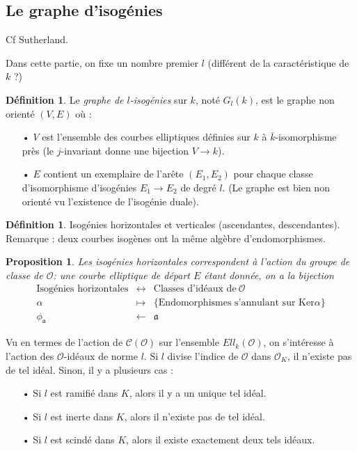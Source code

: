 \documentclass[11pt,a4paper]{article}
\renewcommand{\O}{\mathcal{O}}
\newcommand{\Cl}{\mathcal{C}}
\newcommand{\vers}{\rightarrow}
\renewcommand{\frak}{\mathfrak}
\newtheorem{prop}[thm]{Proposition}
\theoremstyle{definition}
\newtheorem{defi}[thm]{Définition}
\begin{document}
\subsection{Le graphe d'isogénies}

Cf Sutherland.

Dans cette partie, on fixe un nombre premier $l$ (différent de la caractéristique de $k$ ?)

\begin{defi}
Le \emph{graphe de $l$-isogénies} sur $k$, noté $G_l(k)$, est le graphe non orienté $(V,E)$ où :
\begin{itemize}
\item[•] $V$ est l'ensemble des courbes elliptiques définies sur $k$ à $\bar{k}$-isomorphisme près (le $j$-invariant donne une bijection $V\vers k$).
\item[•] $E$ contient un exemplaire de l'arête $(E_1,E_2)$ pour chaque classe d'isomorphisme d'isogénies $E_1\vers E_2$ de degré $l$. (Le graphe est bien non orienté vu l'existence de l'isogénie duale).
\end{itemize}

\end{defi}

\begin{defi}
Isogénies horizontales et verticales (ascendantes, descendantes). Remarque : deux courbes isogènes ont la même algèbre d'endomorphismes.
\end{defi}

\begin{prop}
Les isogénies horizontales correspondent à l'action du groupe de classe de $\O$: une courbe elliptique de départ $E$ étant donnée, on a la bijection
$$\begin{aligned}
\text{Isogénies horizontales} &\leftrightarrow &\text{Classes d'idéaux de}\ \O \\
\alpha &\mapsto &\{\text{Endomorphismes s'annulant sur Ker}\alpha \} \\
\phi_{\frak a} &\leftarrow &\frak a
\end{aligned}$$
\end{prop}

Vu en termes de l'action de $\Cl(\O)$ sur l'ensemble $Ell_k(\O)$, on s'intéresse à l'action des $\O$-idéaux de norme $l$. Si $l$ divise l'indice de $\O$ dans $\O_K$, il n'existe pas de tel idéal. Sinon, il y a plusieurs cas :
\begin{itemize}
\item[•] Si $l$ est ramifié dans $K$, alors il y a un unique tel idéal.
\item[•] Si $l$ est inerte dans $K$, alors il n'existe pas de tel idéal.
\item[•] Si $l$ est scindé dans $K$, alors il existe exactement deux tels idéaux.
\end{itemize}
\end{document}
